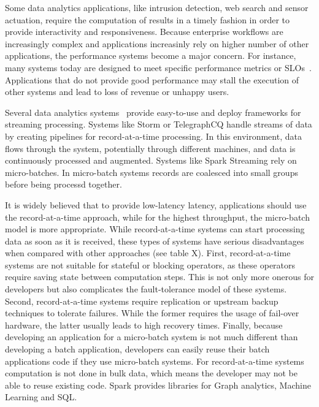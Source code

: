 \noindent
Some data analytics applications, like intrusion detection, web search and sensor actuation, require the computation of results in a timely fashion in order to provide interactivity and responsiveness. 
Because enterprise workflows are increasingly complex and applications increasinly rely on higher number of other applications, the performance systems become a major concern.
For instance, many systems today are designed to meet specific performance metrics or SLOs~\cite{Jockey}.
Applications that do not provide good performance may stall the execution of other systems and lead to loss of revenue or unhappy users.

Several data analytics 
systems~\cite{Babu:2001:CQO:603867.603884,TelegraphCQ,Storm,SparkStreaming,Trill,Naiad,Niagara,StreamInsight,Carney:2002:MSN:1287369.1287389,Sullivan:1998:TSM:1268256.1268258,Condie:2010:MO:1855711.185573,Brito:2011:SLD:2114498.2116192} 
provide easy-to-use and deploy frameworks for streaming processing.
Systems like Storm or TelegraphCQ handle streams of data by creating pipelines for record-at-a-time processing. In this environment, data flows through the system, potentially through different machines, and data is continuously processed and augmented.
Systems like Spark Streaming rely on micro-batches. In micro-batch systems records are coalesced into small groups before being processd together.

It is widely believed that to provide low-latency latency, applications should use the record-at-a-time approach, while for the highest throughput, the micro-batch model is more appropriate. 
While record-at-a-time systems can start processing data as soon as it is received, these types of systems have serious disadvantages when compared with other approaches (see table X).
First, record-at-a-time systems are not suitable for stateful or blocking operators, as these operators require saving state between computation steps. This is not only more onerous for developers but also complicates the fault-tolerance model of these systems.
Second, record-at-a-time systems require replication or upstream backup techniques to tolerate failures.
While the former requires the usage of fail-over hardware, the latter usually leads to high recovery times.
Finally, because developing an application for a micro-batch system is not much different than developing a batch application, developers can easily reuse their batch applications code if they use micro-batch systems. For record-at-a-time systems computation is not done in bulk data, which means the developer may not be able to reuse existing code.
Spark provides libraries for Graph analytics, Machine Learning and SQL.

